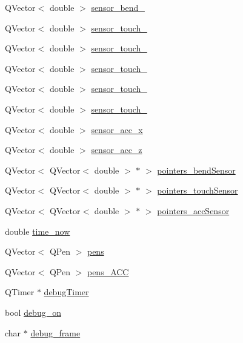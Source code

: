 \begin{DoxyCompactItemize}
\item 
Q\+Vector$<$ double $>$ \hyperlink{class_main_window_a52ba178c00eafa6e8c4fdac74b555637}{sensor\+\_\+bend\+\_}
\item 
Q\+Vector$<$ double $>$ \hyperlink{class_main_window_a14a4f5ab5630e31668a200d994b7dded}{sensor\+\_\+touch\+\_}
\item 
Q\+Vector$<$ double $>$ \hyperlink{class_main_window_aa7da8803225f36fc45ed2fa6d614fdba}{sensor\+\_\+touch\+\_}
\item 
Q\+Vector$<$ double $>$ \hyperlink{class_main_window_a44487fecb5e5621af5af0151723b75df}{sensor\+\_\+touch\+\_}
\item 
Q\+Vector$<$ double $>$ \hyperlink{class_main_window_a39e38081a07e549ec737a222358ac100}{sensor\+\_\+touch\+\_}
\item 
Q\+Vector$<$ double $>$ \hyperlink{class_main_window_a3b13b6facc4b919c04365045e64e85e6}{sensor\+\_\+touch\+\_}
\item 
Q\+Vector$<$ double $>$ \hyperlink{class_main_window_a0af9eda8a9e677a6b69b0b0788149383}{sensor\+\_\+acc\+\_\+x}
\item 
Q\+Vector$<$ double $>$ \hyperlink{class_main_window_a675d363bcc0d4a72b27a18cce31958c0}{sensor\+\_\+acc\+\_\+z}
\item 
Q\+Vector$<$ Q\+Vector$<$ double $>$ $\ast$ $>$ \hyperlink{class_main_window_adae442bba459aafe03b3761691e26b4b}{pointers\+\_\+bend\+Sensor}
\item 
Q\+Vector$<$ Q\+Vector$<$ double $>$ $\ast$ $>$ \hyperlink{class_main_window_a922235380595bb912d0856b548f15f7f}{pointers\+\_\+touch\+Sensor}
\item 
Q\+Vector$<$ Q\+Vector$<$ double $>$ $\ast$ $>$ \hyperlink{class_main_window_a7072ba523f562127bf92df3eef1c9d17}{pointers\+\_\+acc\+Sensor}
\item 
double \hyperlink{class_main_window_a9b456625e28c62ec7cab475f7a552a2c}{time\+\_\+now}
\item 
Q\+Vector$<$ Q\+Pen $>$ \hyperlink{class_main_window_aa4c0759de9124c5cbfb68430255b4567}{pens}
\item 
Q\+Vector$<$ Q\+Pen $>$ \hyperlink{class_main_window_aec4ef361224b3332b651f0f1496e6dcc}{pens\+\_\+\+A\+CC}
\item 
Q\+Timer $\ast$ \hyperlink{class_main_window_a854823622594d31964edae0a1ea6ab57}{debug\+Timer}
\item 
bool \hyperlink{class_main_window_acc93e4640de90d7cf05f44dc6678f412}{debug\+\_\+on}
\item 
char $\ast$ \hyperlink{class_main_window_ae56bcafb6e46026ab75940212f9b871d}{debug\+\_\+frame}
\end{DoxyCompactItemize}



